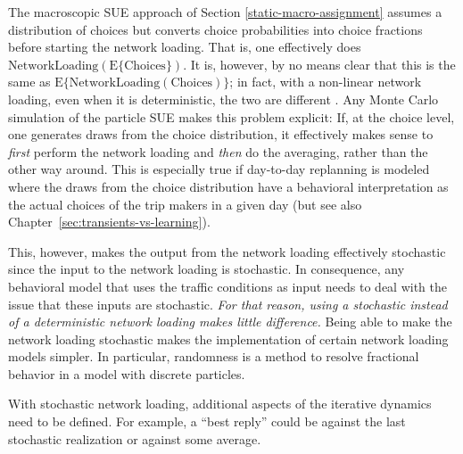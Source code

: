The macroscopic SUE approach of Section \ref{static-macro-assignment}
assumes a distribution of choices but
converts choice probabilities into choice fractions before starting
the network loading.  That is, one effectively does 
$\text{NetworkLoading}( \text{E}\{ \text{Choices} \})$.  
It is, however, by no means clear that this is the same as 
$\text{E}\{ \text{NetworkLoading}( \text{Choices} ) \}$; 
in fact, with a non-linear network loading, even when it is deterministic,
the two are different \citep{cascetta-1989}. Any Monte Carlo simulation of
the particle SUE makes this problem explicit: If, at the choice level,
one generates draws from the choice distribution, it effectively makes
sense to \emph{first} perform the network loading and \emph{then} do
the averaging, rather than the other way around.
This is especially true if day-to-day replanning is modeled where
the draws from the choice distribution have a
behavioral interpretation as the actual choices of the trip makers
in a given day (but see also Chapter~\ref{sec:transients-vs-learning}).

This, however, makes the output from the network loading effectively
stochastic since the input to the network loading is stochastic.  In
consequence, any behavioral model that uses the traffic conditions as
input needs to deal with the issue that these inputs are stochastic.
\emph{For that reason, using a stochastic instead of a deterministic network
loading makes little difference.}  Being able to
make the network loading stochastic makes the implementation of
certain network loading models simpler.  
In particular, randomness is a method to
resolve fractional behavior in a model with discrete particles.

With stochastic network loading, additional aspects
of the iterative dynamics need to be defined.  For example, a ``best
reply'' could be against the last stochastic realization or against
some average.



